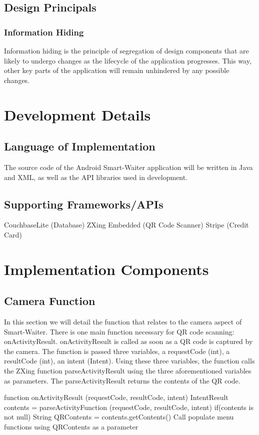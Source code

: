 \documentclass[12pt, titlepage]{article}
\begin{document}
\subsection{Design Principals}
\subsubsection{Information Hiding}
Information hiding is the principle of segregation of design components that are likely to undergo changes as the lifecycle of the application progresses. This way, other key parts of the application will remain unhindered by any possible changes.

\section{Development Details}
\subsection{Language of Implementation}
The source code of the Android Smart-Waiter application will be written in Java and XML, as well as the API libraries used in development. 

\subsection{Supporting Frameworks/APIs}
CouchbaseLite (Database)
ZXing Embedded (QR Code Scanner)
Stripe (Credit Card)

\section{Implementation Components}
\subsection{Camera Function}
In this section we will detail the function that relates to the camera aspect of Smart-Waiter. There is one main function necessary for QR code scanning: onActivityResult. onActivityResult is called as soon as a QR code is captured by the camera. The function is passed three variables, a requestCode (int), a resultCode (int), an intent (Intent). Using these three variables, the function calls the ZXing function parseActivityResult using the three aforementioned variables as parameters. The parseActivityResult returns the contents of the QR code. 
 

function onActivityResult (requestCode, resultCode, intent)
	IntentResult contents = parseActivityFunction (requestCode, resultCode, intent)
	if(contents is not null)
		String QRContents = contents.getContents()
		Call populate menu functions using QRContents as a parameter
		
\end{document}
